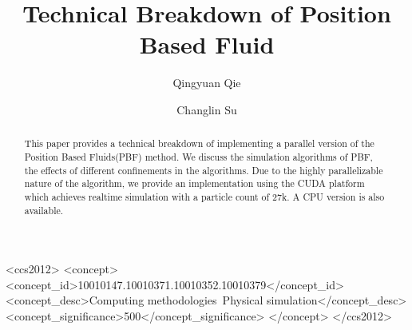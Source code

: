 \documentclass[sigconf]{acmart}
\begin{document}
\title{Technical Breakdown of Position Based Fluid}

\author{Qingyuan Qie}

\author{Changlin Su}

\renewcommand{\shortauthors}{Changlin and Qingyuan}

\begin{abstract}
  This paper provides a technical breakdown of implementing a parallel version of the Position Based Fluids(PBF)\cite{10.1145/2461912.2461984} method. We discuss the simulation algorithms of PBF, the effects of different confinements in the algorithms. Due to the highly parallelizable nature of the algorithm, we provide an implementation using the CUDA platform which achieves realtime simulation with a particle count of 27k. A CPU version is also available.
\end{abstract}

\begin{CCSXML}
  <ccs2012>
     <concept>
         <concept_id>10010147.10010371.10010352.10010379</concept_id>
         <concept_desc>Computing methodologies~Physical simulation</concept_desc>
         <concept_significance>500</concept_significance>
         </concept>
   </ccs2012>
\end{CCSXML}
  
\end{document}
